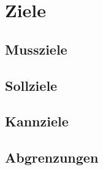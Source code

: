 \chapter{Ziele}

\section{Mussziele}
\label{sec:ziele.Mussziele}

\section{Sollziele}
\label{sec:ziele.Sollziele}

\section{Kannziele}
\label{sec:ziele.Kannziele}

\section{Abgrenzungen}
\label{sec:ziele.Abgrenzungen}